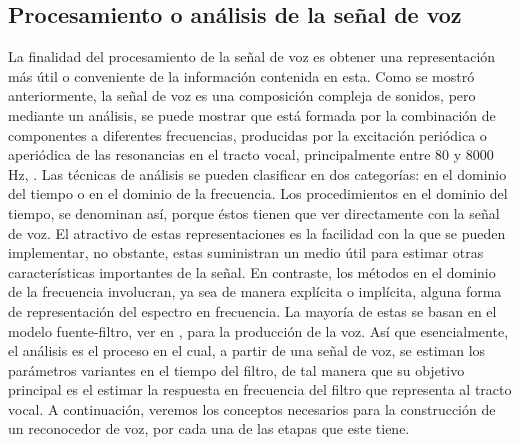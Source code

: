 \subsection{Procesamiento o análisis de la señal de voz}
La finalidad del procesamiento de la señal de voz es obtener una representación más útil o conveniente de la información contenida en esta. Como se mostró anteriormente, la señal de voz es una composición compleja de sonidos, pero mediante un análisis, se puede mostrar que está formada por la combinación de componentes a diferentes frecuencias, producidas por la excitación periódica o aperiódica de las resonancias en el tracto vocal, principalmente entre 80 y 8000 Hz, \cite{rowden}.
\vskip 0.5cm
Las técnicas de análisis se pueden clasificar en dos categorías: en el dominio del tiempo o en el dominio de la frecuencia. Los procedimientos en el dominio del tiempo, se denominan así, porque éstos tienen que ver directamente con la señal de voz. El atractivo de estas representaciones es la facilidad con la que se pueden implementar, no obstante, estas suministran un medio útil para estimar otras características importantes de la señal. En contraste, los métodos en el dominio de la frecuencia involucran, ya sea de manera explícita o implícita, alguna forma de representación del espectro en frecuencia. 
\vskip 0.5cm
La mayoría de estas se basan en el modelo fuente-filtro, ver en \cite{rowden}, para la producción de la voz. Así que esencialmente, el análisis es el proceso en el cual, a partir de una señal de voz, se estiman los parámetros variantes en el tiempo del filtro, de tal manera que su objetivo principal es el estimar la respuesta en frecuencia del filtro que representa al tracto vocal. 
\vskip 0.5cm
A continuación, veremos los conceptos necesarios para la construcción de un reconocedor de voz, por cada una de las etapas que este tiene.

